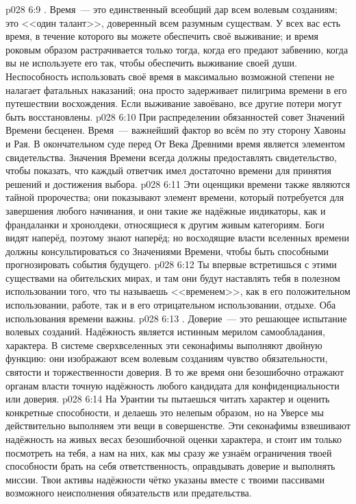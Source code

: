 \vs p028 6:9 . Время~--- это единственный всеобщий дар всем волевым созданиям; это <<один талант>>, доверенный всем разумным существам. У всех вас есть время, в течение которого вы можете обеспечить своё выживание; и время роковым образом растрачивается только тогда, когда его предают забвению, когда вы не используете его так, чтобы обеспечить выживание своей души. Неспособность использовать своё время в максимально возможной степени не налагает фатальных наказаний; она просто задерживает пилигрима времени в его путешествии восхождения. Если выживание завоёвано, все другие потери могут быть восстановлены.
\vs p028 6:10 При распределении обязанностей совет Значений Времени бесценен. Время~--- важнейший фактор во всём по эту сторону Хавоны и Рая. В окончательном суде перед От Века Древними время является элементом свидетельства. Значения Времени всегда должны предоставлять свидетельство, чтобы показать, что каждый ответчик имел достаточно времени для принятия решений и достижения выбора.
\vs p028 6:11 Эти оценщики времени также являются тайной пророчества; они показывают элемент времени, который потребуется для завершения любого начинания, и они такие же надёжные индикаторы, как и франдаланки и хронолдеки, относящиеся к другим живым категориям. Боги видят наперёд, поэтому знают наперёд; но восходящие власти вселенных времени должны консультироваться со Значениями Времени, чтобы быть способными прогнозировать события будущего.
\vs p028 6:12 Ты впервые встретишься с этими существами на обительских мирах, и там они будут наставлять тебя в полезном использовании того, что ты называешь <<временем>>, как в его положительном использовании, работе, так и в его отрицательном использовании, отдыхе. Оба использования времени важны.
\vs p028 6:13 . Доверие~--- это решающее испытание волевых созданий. Надёжность является истинным мерилом самообладания, характера. В системе сверхвселенных эти секонафимы выполняют двойную функцию: они изображают всем волевым созданиям чувство обязательности, святости и торжественности доверия. В то же время они безошибочно отражают органам власти точную надёжность любого кандидата для конфиденциальности или доверия.
\vs p028 6:14 На Урантии ты пытаешься читать характер и оценить конкретные способности, и делаешь это нелепым образом, но на Уверсе мы действительно выполняем эти вещи в совершенстве. Эти секонафимы взвешивают надёжность на живых весах безошибочной оценки характера, и стоит им только посмотреть на тебя, а нам на них, как мы сразу же узнаём ограничения твоей способности брать на себя ответственность, оправдывать доверие и выполнять миссии. Твои активы надёжности чётко указаны вместе с твоими пассивами возможного неисполнения обязательств или предательства.
